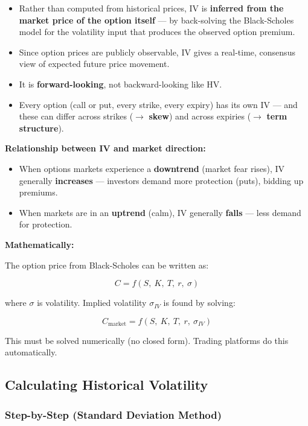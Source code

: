 \documentclass[12pt,openany]{book}
\begin{document}
\begin{itemize}[leftmargin=*]
    \item Rather than computed from historical prices, IV is \textbf{inferred from the market price of the option itself} — by back-solving the Black-Scholes model for the volatility input that produces the observed option premium.
    \item Since option prices are publicly observable, IV gives a real-time, consensus view of expected future price movement.
    \item It is \textbf{forward-looking}, not backward-looking like HV.
    \item Every option (call or put, every strike, every expiry) has its own IV — and these can differ across strikes (\(\rightarrow\) \textbf{skew}) and across expiries (\(\rightarrow\) \textbf{term structure}).
\end{itemize}

\textbf{Relationship between IV and market direction:}
\begin{itemize}[leftmargin=*]
    \item When options markets experience a \textbf{downtrend} (market fear rises), IV generally \textbf{increases} — investors demand more protection (puts), bidding up premiums.
    \item When markets are in an \textbf{uptrend} (calm), IV generally \textbf{falls} — less demand for protection.
\end{itemize}

\textbf{Mathematically:}

The option price from Black-Scholes can be written as:

\[
C = f(S,\ K,\ T,\ r,\ \sigma)
\]

where \(\sigma\) is volatility. Implied volatility \(\sigma_{IV}\) is found by solving:

\[
C_{\text{market}} = f(S,\ K,\ T,\ r,\ \sigma_{IV})
\]

This must be solved numerically (no closed form). Trading platforms do this automatically.

\subsection{Calculating Historical Volatility}

\subsubsection{Step-by-Step (Standard Deviation Method)}
\end{document}
